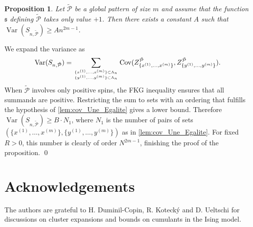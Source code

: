 \documentclass{amsart}
\def\GP{\mathcal{\tilde{P}}}
\DeclareMathOperator\Var{Var}
\DeclareMathOperator\Cov{Cov}
\numberwithin{equation}{section}
\newtheorem{proposition}[theorem]{Proposition}
\theoremstyle{remark}
\renewenvironment{proof}[1][Proof]{\begin{trivlist}
\item[\hskip \labelsep {\bfseries #1:}]}{\qed\end{trivlist}}
\begin{document}
\begin{proposition}
  \label{prop:Variance_Lower_Bound}
  Let $\GP$ be a global pattern of size $m$ and assume that the function $\mathfrak{s}$ defining $\GP$
  takes only value $+1$.
  Then there exists a constant $A$ such that
  $\Var(S_{n,\GP}) \ge A n^{2m-1}$.
\end{proposition}
\begin{proof}
  We expand the variance as
  \[\Var(S_{n,\GP}) = \sum_{\{x^{(1)}, \dots ,x^{(m)}\} \subset \Lambda_n \atop \{y^{(1)}, \dots ,y^{(m)}\} \subset \Lambda_n}
  \Cov(Z_{\{x^{(1)}, \dots ,x^{(m)}\}}^{\GP}, Z_{\{y^{(1)}, \dots ,y^{(m)}\}}^{\GP}).\]
  When $\GP$ involves only positive spins, the FKG inequality ensures that all summands are positive.
  Restricting the sum to sets with an ordering that fulfills
  the hypothesis of \cref{lem:cov_Une_Egalite} gives a lower bound.
  Therefore $\Var(S_{n,\GP}) \ge B \cdot N_1$, where $N_1$ is the number of pairs of sets
  $(\{x^{(1)}, \dots ,x^{(m)}\},\{y^{(1)}, \dots ,y^{(m)}\})$ as in \cref{lem:cov_Une_Egalite}.
  For fixed $R>0$, this number is clearly of order $N^{2m-1}$, finishing the proof of the proposition.
\end{proof}


\section*{Acknowledgements}
The authors are grateful to H. Duminil-Copin, R. Kotecký and D. Ueltschi
for discussions on cluster expansions and bounds on cumulants in the Ising model.




\end{document}
